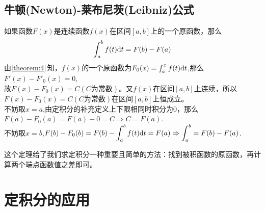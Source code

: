 \subsection{牛顿(Newton)-莱布尼茨(Leibniz)公式}

\theorem[微积分基本定理]
\label{theorem:4.8}
如果函数$F(x)$是连续函数$f(x)$在区间$[a,b]$上的一个原函数，那么
\begin{equation}
	\int_{a}^{b}f(t){\rm{d}} t=F(b)-F(a)
\end{equation}
\proof 由\ref{theorem:4}$\,$知，$f(x)$的一个原函数为$F_0(x)=\int_{a}^{x}f(t){\rm{d}} t$,那么$F'(x)-F'_0(x)=0$,\\
故$F(x)-F_0(x)=C(C\text{为常数})$。又$f(x)$在区间$[a,b]$上连续，所以$F(x)-F_0(x)=C(C\text{为常数})$在区间$[a,b]$上恒成立。\\
不妨取$x=a$,由定积分的补充定义上下限相同时积分为0，那么$F(a)-F_0(a)=F(a)-0=C\Rightarrow C=F(a)$.\vspace{0.5em}\\
不妨取$x=b$,$\displaystyle F(b)-F_0(b)=F(b)-\int_{a}^{b}f(t){\rm{d}} t=F(a) \Rightarrow \int_{a}^{b}=F(b)-F(a)$.
\par 这个定理给了我们求定积分一种重要且简单的方法：找到被积函数的原函数，再计算两个端点函数值之差即可。
\section{定积分的应用}
